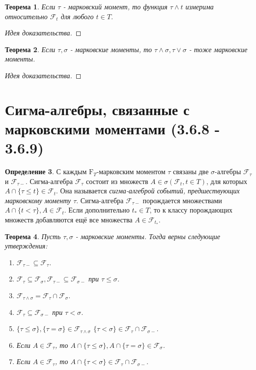 \documentclass[16pt]{article}
\newtheorem{theorem}{Теорема}[section]
\theoremstyle{definition}
\newtheorem{definition}[theorem]{Определение}
\begin{document}
\begin{theorem}
Если $\tau$ - марковский момент, то функция $\tau \wedge t$ измерима относительно $\mathcal{F}_t$ для любого $t \in T$.
\end{theorem}
\begin{proof}[Идея доказательства]

\end{proof}
\begin{theorem}
Если $\tau, \sigma$ - марковские моменты, то $\tau \wedge \sigma, \tau \vee \sigma$ - тоже марковские моменты.
\end{theorem}
\begin{proof}[Идея доказательства]

\end{proof}

\section{Сигма-алгебры, связанные с марковскими моментами (3.6.8 - 3.6.9)}
\begin{definition}
С каждым $\mathrm{F}_T$-марковским моментом $\tau$ связаны две $\sigma$-алгебры $\mathcal{F}_\tau$ и $\mathcal{F}_{\tau-}$. \newline
Сигма-алгебра $\mathcal{F}_\tau$ состоит из множеств $A \in \sigma(\mathcal{F}_t, t \in T)$, для которых $A \cap \{\tau \le t\} \in \mathcal{F}_t$. Она называется \textit{сигма-алгеброй событий, предшествующих марковскому моменту $\tau$}. \newline
Сигма-алгебра $\mathcal{F}_{\tau-}$ порождается множествами $A \cap \{t < \tau\}, A \in \mathcal{F}_t$. Если дополнительно $t_* \in T$, то к классу порождающих множеств добавляются ещё все множества $A \in \mathcal{F}_{t_*}$.
\end{definition}
\begin{theorem}
Пусть $\tau, \sigma$ - марковские моменты. Тогда верны следующие утверждения:
\begin{enumerate}
    \item $\mathcal{F}_{\tau-} \subseteq \mathcal{F}_\tau$.
    \item $\mathcal{F}_{\tau} \subseteq \mathcal{F}_\sigma, \mathcal{F}_{\tau-} \subseteq \mathcal{F}_{\sigma-}$ при $\tau \le \sigma$.
    \item $\mathcal{F}_{\tau \wedge \sigma} = \mathcal{F}_\tau \cap \mathcal{F}_\sigma$.
    \item $\mathcal{F}_{\tau} \subseteq \mathcal{F}_{\sigma-}$ при $\tau < \sigma$.
    \item $\{\tau \le \sigma\}, \{\tau = \sigma\} \in \mathcal{F}_{\tau \wedge \sigma}$ \newline $\{\tau < \sigma\} \in \mathcal{F}_\tau \cap \mathcal{F}_{\sigma-}$.
    \item Если $A \in \mathcal{F}_\tau$, то $A \cap \{\tau \le \sigma\}, A \cap \{\tau = \sigma\} \in \mathcal{F}_\sigma$.
    \item Если $A \in \mathcal{F}_\tau$, то $A \cap \{\tau < \sigma\} \in \mathcal{F}_\tau \cap \mathcal{F}_{\sigma-}$.
\end{enumerate}
\end{theorem}
\end{document}

